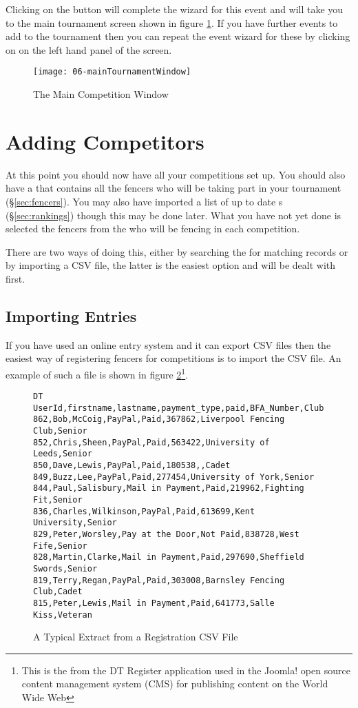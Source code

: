 \documentclass[a4paper,11pt]{memoir}
\begin{document}
Clicking on the  button will complete the wizard for this event and will take you to the main tournament screen shown in figure \ref{fig:06-mainTournamentWindow}. If you have further events to add to the tournament then you can repeat the event wizard for these by clicking on  on the left hand panel of the screen.

\begin{figure}[!ht]
 \centering
 \texttt{[image: 06-mainTournamentWindow]}
 \caption{The Main Competition Window} \label{fig:06-mainTournamentWindow}
\end{figure}

\section{Adding Competitors}
At this point you should now have all your competitions set up. You should also have a  that contains all the fencers who will be taking part in your tournament (\S\ref{sec:fencers}). You may also have imported a list of up to date s (\S\ref{sec:rankings}) though this may be done later. What you have not yet done is selected the fencers from the  who will be fencing in each competition. 

There are two ways of doing this, either by searching the  for matching records or by importing a CSV file, the latter is the easiest option and will be dealt with first.

\subsection{Importing Entries}

If you have used an online entry system and it can export CSV files then the easiest way of registering fencers for competitions is to import the CSV file. An example of such a file is shown in figure \ref{fig:06-registrationFile}\footnote{This is the from the DT Register application used in the Joomla! open source content management system (CMS) for publishing content on the World Wide Web}.

\begin{figure}[!ht]
 \begin{verbatim}
DT UserId,firstname,lastname,payment_type,paid,BFA_Number,Club,Age_Group
862,Bob,McCoig,PayPal,Paid,367862,Liverpool Fencing Club,Senior
852,Chris,Sheen,PayPal,Paid,563422,University of Leeds,Senior
850,Dave,Lewis,PayPal,Paid,180538,,Cadet
849,Buzz,Lee,PayPal,Paid,277454,University of York,Senior
844,Paul,Salisbury,Mail in Payment,Paid,219962,Fighting Fit,Senior
836,Charles,Wilkinson,PayPal,Paid,613699,Kent University,Senior
829,Peter,Worsley,Pay at the Door,Not Paid,838728,West Fife,Senior
828,Martin,Clarke,Mail in Payment,Paid,297690,Sheffield Swords,Senior
819,Terry,Regan,PayPal,Paid,303008,Barnsley Fencing Club,Cadet
815,Peter,Lewis,Mail in Payment,Paid,641773,Salle Kiss,Veteran
 \end{verbatim}
 \caption{A Typical Extract from a Registration CSV File}\label{fig:06-registrationFile}
\end{figure}
\end{document}
